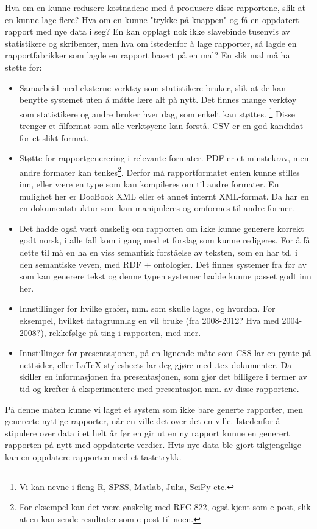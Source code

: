 \documentclass[11pt]{article}
\begin{document}
Hva om en kunne redusere kostnadene med å produsere disse rapportene, slik at en kunne lage flere? Hva om en kunne "trykke på knappen" og få en oppdatert rapport med nye data i seg?
En kan opplagt nok ikke slavebinde tusenvis av statistikere og skribenter, men hva om istedenfor å lage rapporter, så lagde en rapportfabrikker som lagde en rapport basert på en mal?
En slik mal må ha støtte for:
\begin{itemize}
\item Samarbeid med eksterne verktøy som statistikere bruker, slik at de kan benytte systemet uten å måtte lære alt på nytt.
  Det finnes mange verktøy som statistikere og andre bruker hver dag, som enkelt kan støttes. \footnote{Vi kan nevne i fleng R, SPSS, Matlab, Julia, SciPy etc.}
  Disse trenger et filformat som alle verktøyene kan forstå. CSV\cite{csv} er en god kandidat for et slikt format.
  
\item Støtte for rapportgenerering i relevante formater. PDF er et minstekrav, men andre formater kan tenkes\footnote{For eksempel kan det være ønskelig med RFC-822, også kjent som e-post, slik at en kan sende resultater som e-post til noen.}.
  Derfor må rapportformatet enten kunne stilles inn, eller være en type som kan kompileres om til andre formater.
  En mulighet her er DocBook XML eller et annet internt XML-format. Da har en en dokumentstruktur som kan manipuleres og omformes til andre former.

  \item Det hadde også vært ønskelig om rapporten om ikke kunne generere korrekt godt norsk, i alle fall kom i gang med et forslag som kunne redigeres. For å få dette til må en ha en viss semantisk forståelse av teksten, som en har td. i den semantiske veven, med RDF\cite{rdf11primer} + ontologier\cite{damloil}\cite{owlref}. Det finnes systemer fra før av som kan generere tekst og denne typen systemer hadde kunne passet godt inn her.

\item Innstillinger for hvilke grafer, mm. som skulle lages, og hvordan.
  For eksempel, hvilket datagrunnlag en vil bruke (fra 2008-2012? Hva med 2004-2008?), rekkefølge på ting i rapporten, med mer.
  
\item Innstillinger for presentasjonen, på en lignende måte som CSS lar en pynte på nettsider, eller \LaTeX -stylesheets lar deg gjøre med .tex dokumenter.
  Da skiller en informasjonen fra presentasjonen, som gjør det billigere i termer av tid og krefter å eksperimentere med presentasjon mm. av disse rapportene.
\end{itemize} 
På denne måten kunne vi laget et system som ikke bare generte rapporter, men genererte nyttige rapporter, når en ville det over det en ville.
Istedenfor å stipulere over data i et helt år før en gir ut en ny rapport kunne en generert rapporten på nytt med oppdaterte verdier. Hvis nye data ble gjort tilgjengelige kan en oppdatere rapporten med et tastetrykk.
\end{document}
